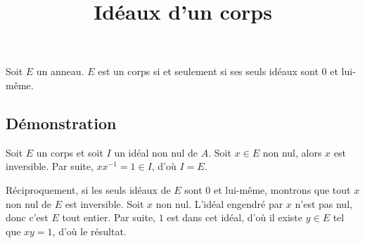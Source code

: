 \documentclass[fontsize=12pt,twoside=false,parskip=half]{scrartcl}
\title{Idéaux d’un corps}
\date{}
\author{}
\begin{document}
\maketitle
   \begin{Theoreme}
      Soit $E$ un anneau. $E$ est un corps si et seulement si ses seuls idéaux sont ${0}$ et lui-même.
   \end{Theoreme}
   \subsection{Démonstration}
      Soit $E$ un corps et soit $I$ un idéal non nul de $A$. Soit $x \in E$ non nul, alors $x$ est
      inversible. Par suite, $xx^{-1} = 1 \in I$, d’où $I = E$.
      
      Réciproquement, si les seuls idéaux de $E$ sont ${0}$ et lui-même, montrons que tout $x$ 
      non nul de $E$ est inversible. Soit $x$ non nul. L’idéal engendré par $x$ n’est pas nul, 
      donc c’est $E$ tout entier. Par suite, $1$ est dans cet idéal, d’où il existe $y \in E$
      tel que $xy = 1$, d’où le résultat. 
\end{document}
